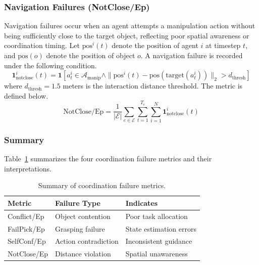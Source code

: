 \documentclass{article}
\theoremstyle{plain}
\theoremstyle{definition}
\theoremstyle{remark}
\begin{document}
\subsubsection{Navigation Failures (NotClose/Ep)}

Navigation failures occur when an agent attempts a manipulation action without being sufficiently close to the target object, reflecting poor spatial awareness or coordination timing. Let $\text{pos}^i(t)$ denote the position of agent $i$ at timestep $t$, and $\text{pos}(o)$ denote the position of object $o$. A navigation failure is recorded under the following condition.
\begin{equation}
    \mathbf{1}_{\text{notclose}}^i(t) = \mathbf{1}\left[ a_t^i \in \mathcal{A}_{\text{manip}} \land \|\text{pos}^i(t) - \text{pos}(\text{target}(a_t^i))\|_2 > d_{\text{thresh}} \right]
\end{equation}
where $d_{\text{thresh}} = 1.5$ meters is the interaction distance threshold. The metric is defined below.
\begin{equation}
    \text{NotClose/Ep} = \frac{1}{|\mathcal{E}|} \sum_{e \in \mathcal{E}} \sum_{t=1}^{T_e} \sum_{i=1}^{N} \mathbf{1}_{\text{notclose}}^i(t)
\end{equation}

\subsubsection{Summary}

Table~\ref{tab:failure_metrics_summary} summarizes the four coordination failure metrics and their interpretations.

\begin{table}[h]
\centering
\caption{Summary of coordination failure metrics.}
\label{tab:failure_metrics_summary}
\begin{tabular}{lll}
\toprule
\textbf{Metric} & \textbf{Failure Type} & \textbf{Indicates} \\
\midrule
Conflict/Ep & Object contention & Poor task allocation \\
FailPick/Ep & Grasping failure & State estimation errors \\
SelfConf/Ep & Action contradiction & Inconsistent guidance \\
NotClose/Ep & Distance violation & Spatial unawareness \\
\bottomrule
\end{tabular}
\end{table}
\end{document}
